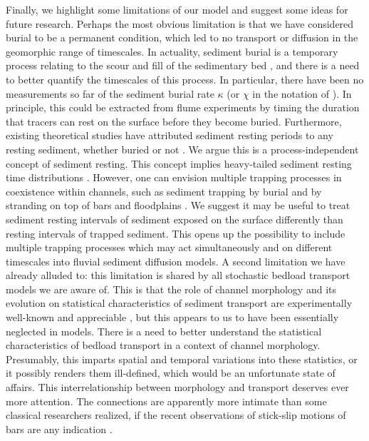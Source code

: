 \documentclass[]{agujournal2018}
\begin{document}
Finally, we highlight some limitations of our model and suggest some ideas for future research.
Perhaps the most obvious limitation is that we have considered burial to be a permanent condition, which led to no transport or diffusion in the geomorphic range of timescales.
In actuality, sediment burial is a temporary process relating to the scour and fill of the sedimentary bed \citep[e.g.][]{Hassan1994,Wong2007,Voepel2013,Martin2014}, and there is a need to better quantify the timescales of this process.
In particular, there have been no measurements so far of the sediment burial rate $\kappa$ (or $\chi$ in the notation of \citet{Wu2019}). In principle, this could be extracted from flume experiments by timing the duration that tracers can rest on the surface before they become buried.
Furthermore, existing theoretical studies have attributed sediment resting periods to any resting sediment, whether buried or not \citep[e.g.][]{Voepel2013,Martin2014}.
We argue this is a process-independent concept of sediment resting.
This concept implies heavy-tailed sediment resting time distributions \citep[e.g.][]{Martin2012,Hassan2013, Olinde2015}.
However, one can envision multiple trapping processes in coexistence within channels, such as sediment trapping by burial \citep[e.g.][]{Hassan1994,Haschenburger2013,Ferguson2002} and by stranding on top of bars \citep[e.g.][]{Ferguson2002,Bradley2017} and floodplains \citep[e.g.][]{Malmon2003}.
We suggest it may be useful to treat sediment resting intervals of sediment exposed on the surface differently than resting intervals of trapped sediment.
This opens up the possibility to include multiple trapping processes which may act simultaneously and on different timescales into fluvial sediment diffusion models.
A second limitation we have already alluded to: this limitation is shared by all stochastic bedload transport models we are aware of.
This is that the role of channel morphology and its evolution on statistical characteristics of sediment transport are experimentally well-known and appreciable \citep[e.g.][]{Pyrce2005,Kasprak2014, Hassan2017}, but this appears to us to have been essentially neglected in models.
There is a need to better understand the statistical characteristics of bedload transport in a context of channel morphology.
Presumably, this imparts spatial and temporal variations into these statistics, or it possibly renders them ill-defined, which would be an unfortunate state of affairs.
This interrelationship between morphology and transport deserves ever more attention.
The connections are apparently more intimate than some classical researchers realized, if the recent observations of stick-slip motions of bars are any indication \citep{Dhont2018}.
\end{document}
